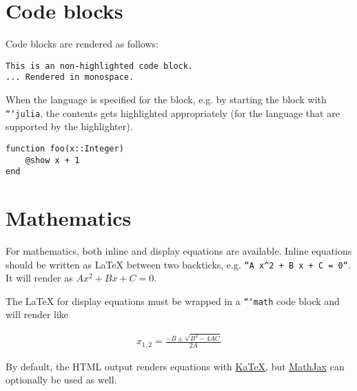 \section{Code blocks}



\label{14660894509460337656}{}


Code blocks are rendered as follows:




\begin{lstlisting}
This is an non-highlighted code block.
... Rendered in monospace.
\end{lstlisting}



When the language is specified for the block, e.g. by starting the block with \texttt{```julia}, the contents gets highlighted appropriately (for the language that are supported by the highlighter).




\begin{verbatim}
function foo(x::Integer)
    @show x + 1
end
\end{verbatim}



\section{Mathematics}



\label{9406902154236239312}{}


For mathematics, both inline and display equations are available. Inline equations should be written as LaTeX between two backticks, e.g. \texttt{``A x{\textasciicircum}2 + B x + C = 0``}. It will render as \(A x^2 + B x + C = 0\).



The LaTeX for display equations must be wrapped in a \texttt{```math} code block and will render like



\begin{equation*}
\begin{split}x_{1,2} = \frac{-B \pm \sqrt{B^2 - 4 A C}}{2A}\end{split}\end{equation*}


By default, the HTML output renders equations with \href{https://katex.org/}{KaTeX}, but \href{https://www.mathjax.org/}{MathJax} can optionally be used as well.



